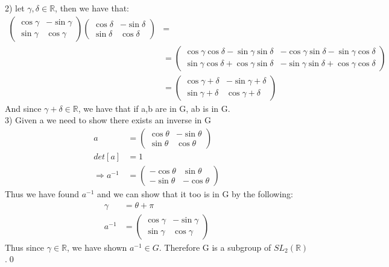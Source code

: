 \documentclass[a4paper, 11pt]{article}
\begin{document}
2) let $\gamma, \delta \in \mathbb{R}$, then we have that: 
\begin{align*}
	\begin{pmatrix}
		\cos{\gamma} & -\sin{\gamma}\\
		\sin{\gamma} & \cos{\gamma}
	\end{pmatrix}
	\begin{pmatrix}
		\cos{\delta} & -\sin{\delta} \\ 
		\sin{\delta} & \cos{\delta} 
	\end{pmatrix}
	&= \\ 
	&= 
	\begin{pmatrix}
		\cos{\gamma}\cos{\delta}-\sin{\gamma}\sin{\delta} & -\cos{\gamma}\sin{\delta}-\sin{\gamma}\cos{\delta} \\ 
		\sin{\gamma}\cos{\delta} + \cos{\gamma}\sin{\delta} & -\sin{\gamma}\sin{\delta}+\cos{\gamma}\cos{\delta}
	\end{pmatrix} \\
	&=
	\begin{pmatrix}
		\cos{\gamma+\delta} & -\sin{\gamma+\delta}\\
		\sin{\gamma+\delta} & \cos{\gamma+\delta}
	\end{pmatrix}
\end{align*}
And since $\gamma+\delta \in \mathbb{R}$, we have that if a,b are in G, ab is in G. \\

3) Given a we need to show there exists an inverse in G
\begin{align*}
	a &=
	\begin{pmatrix}
		\cos{\theta} & -\sin{\theta} \\ 
		\sin{\theta} & \cos{\theta}
	\end{pmatrix} \\ 
	det[a] &= 1 \\ 
	\Rightarrow a^{-1} &= 
	\begin{pmatrix}
		-\cos{\theta} & \sin{\theta} \\ 
		-\sin{\theta} & -\cos{\theta}
	\end{pmatrix}
\end{align*}
Thus we have found $a^{-1}$ and we can show that it too is in G by the following: 
	\begin{align*}
		\gamma &= \theta+\pi \\ 
		a^{-1} &= 
		\begin{pmatrix}
			\cos{\gamma} & -\sin{\gamma} \\ 
			\sin{\gamma} & \cos{\gamma}
		\end{pmatrix}
	\end{align*}
Thus since $\gamma \in \mathbb{R}$, we have shown $a^{-1} \in G$. Therefore G is a subgroup of $SL_2(\mathbb{R})$.\qed
\end{document}
